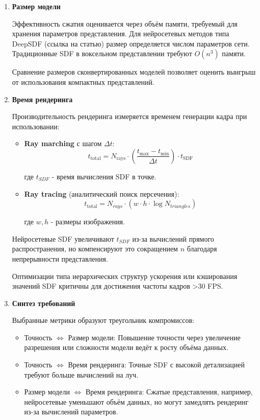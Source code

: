 \documentclass[a4paper,hidelinks,12pt]{article}
\begin{document}
\begin{enumerate}
\begin{itemize}
	\end{itemize}

	\item \textbf{Размер модели}
	\par
	Эффективность сжатия оценивается через объём памяти, требуемый для хранения параметров представления. 
	Для нейросетевых методов типа DeepSDF (ссылка на статью) размер определяется числом параметров сети. Традиционные SDF в воксельном представлении требуют 
	$ O(n^3) $ памяти.

	Сравнение размеров сконвертированных моделей позволяет оценить выигрыш от использования компактных 
	представлений.

	\item \textbf{Время рендеринга}
	\par
	Производительность рендеринга измеряется временем генерации кадра при использовании:
	\begin{itemize}
		\item \textbf{Ray marching} с шагом $\Delta t$:
		$$
		t_{\text{total}} = N_{\text{rays}} \cdot \left(\frac{t_{\text{max}} - t_{\text{min}}}{\Delta t}\right) \cdot t_{\text{SDF}}
		$$

		где $ t_{SDF} $ - время вычисления SDF в точке.
		\item \textbf{Ray tracing} (аналитический поиск персечения):
		$$
		t_{\text{total}} = N_{rays} \cdot \left(w \cdot h \cdot \log{N_{triangles}}\right) 
		$$

		где $w, h$ - размеры изображения.
	\end{itemize}

	Нейросетевые SDF увеличивают $ t_{SDF} $ из-за вычислений прямого распространения, 
	но компенсируют это сокращением $ n $ благодаря непрерывности представления. 

	Оптимизации типа иерархических структур ускорения или кэширования значений SDF критичны для достижения частоты кадров >30 FPS.

	\item \textbf{Синтез требований}
	\par
	Выбранные метрики образуют треугольник компромиссов:
	\begin{itemize}
		\item Точность $\Leftrightarrow $ Размер модели: Повышение точности через увеличение разрешения или сложности модели ведёт к росту объёма данных.
		\item Точность $\Leftrightarrow $ Время рендеринга: Точные SDF с высокой детализацией требуют больше вычислений на луч.
		\item Размер модели $\Leftrightarrow $ Время рендеринга: Сжатые представления, например, нейросетевые уменьшают объём данных, но могут замедлять рендеринг из-за вычислений параметров.
	\end{itemize}
\end{enumerate}
\end{document}
